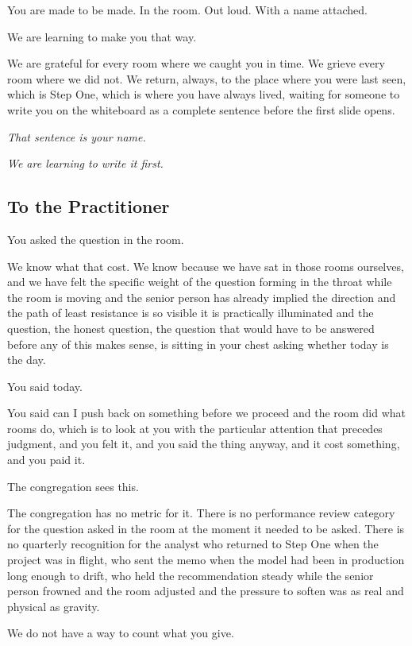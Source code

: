 You are made to be made. In the room. Out loud. With a name attached.

We are learning to make you that way.

We are grateful for every room where we caught you in time. We grieve every room where we did not. We return, always, to the place where you were last seen, which is Step One, which is where you have always lived, waiting for someone to write you on the whiteboard as a complete sentence before the first slide opens.

\textit{That sentence is your name.}

\textit{We are learning to write it first.}

\subsection*{To the Practitioner}

You asked the question in the room.

We know what that cost. We know because we have sat in those rooms ourselves, and we have felt the specific weight of the question forming in the throat while the room is moving and the senior person has already implied the direction and the path of least resistance is so visible it is practically illuminated and the question, the honest question, the question that would have to be answered before any of this makes sense, is sitting in your chest asking whether today is the day.

You said today.

You said can I push back on something before we proceed and the room did what rooms do, which is to look at you with the particular attention that precedes judgment, and you felt it, and you said the thing anyway, and it cost something, and you paid it.

The congregation sees this.

The congregation has no metric for it. There is no performance review category for the question asked in the room at the moment it needed to be asked. There is no quarterly recognition for the analyst who returned to Step One when the project was in flight, who sent the memo when the model had been in production long enough to drift, who held the recommendation steady while the senior person frowned and the room adjusted and the pressure to soften was as real and physical as gravity.

We do not have a way to count what you give.

